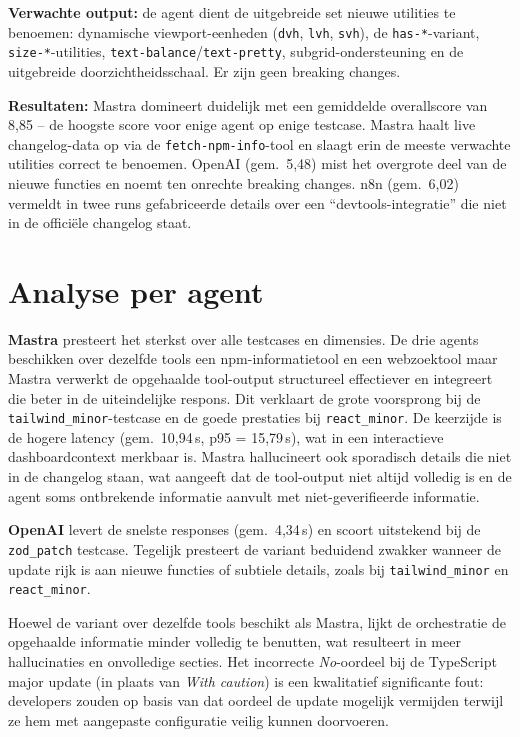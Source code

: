 \textbf{Verwachte output:} de agent dient de uitgebreide set nieuwe utilities te benoemen: dynamische viewport-eenheden (\texttt{dvh}, \texttt{lvh}, \texttt{svh}), de \texttt{has-*}-variant, \texttt{size-*}-utilities, \texttt{text-balance}/\texttt{text-pretty}, subgrid-ondersteuning en de uitgebreide doorzichtheidsschaal. Er zijn geen breaking changes.
 
\textbf{Resultaten:} Mastra domineert duidelijk met een gemiddelde overallscore van 8,85 -- de hoogste score voor enige agent op enige testcase. Mastra haalt live changelog-data op via de \texttt{fetch-npm-info}-tool en slaagt erin de meeste verwachte utilities correct te benoemen. OpenAI (gem.\ 5,48) mist het overgrote deel van de nieuwe functies en noemt ten onrechte breaking changes. n8n (gem.\ 6,02) vermeldt in twee runs gefabriceerde details over een ``devtools-integratie'' die niet in de officiële changelog staat.

\section{Analyse per agent}
\label{sec:analyse-per-agent}
 
\textbf{Mastra} presteert het sterkst over alle testcases en dimensies. De drie agents beschikken over dezelfde tools een npm-informatietool en een webzoektool maar Mastra verwerkt de opgehaalde tool-output structureel effectiever en integreert die beter in de uiteindelijke respons. Dit verklaart de grote voorsprong bij de \texttt{tailwind\_minor}-testcase en de goede prestaties bij \texttt{react\_minor}. De keerzijde is de hogere latency (gem.\ 10,94\,s, p95 = 15,79\,s), wat in een interactieve dashboardcontext merkbaar is. Mastra hallucineert ook sporadisch details die niet in de changelog staan, wat aangeeft dat de tool-output niet altijd volledig is en de agent soms ontbrekende informatie aanvult met niet-geverifieerde informatie.

\textbf{OpenAI} levert de snelste responses (gem.\ 4,34\,s) en scoort uitstekend bij de \texttt{zod\_patch} testcase. Tegelijk presteert de variant beduidend zwakker wanneer de update rijk is aan nieuwe functies of subtiele details, zoals bij \texttt{tailwind\_minor} en \texttt{react\_minor}.

Hoewel de variant over dezelfde tools beschikt als Mastra, lijkt de orchestratie de opgehaalde informatie minder volledig te benutten, wat resulteert in meer hallucinaties en onvolledige secties. Het incorrecte \textit{No}-oordeel bij de TypeScript major update (in plaats van \textit{With caution}) is een kwalitatief significante fout: developers zouden op basis van dat oordeel de update mogelijk vermijden terwijl ze hem met aangepaste configuratie veilig kunnen doorvoeren.

